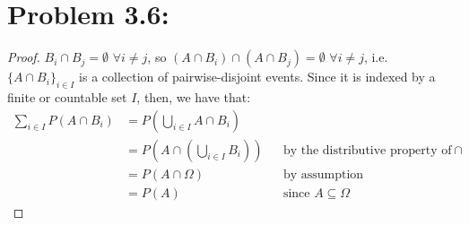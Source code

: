 \documentclass{article}
\begin{document}
\section{Problem 3.6:}

\begin{proof}
$B_i \cap B_j = \emptyset$ $\forall i \ne j$, so $(A \cap B_i) \cap (A \cap B_j) = \emptyset$ $\forall i \ne j$, i.e. $\{A \cap B_i\}_{i \in I}$ is a collection of pairwise-disjoint events. Since it is indexed by a finite or countable set $I$, then, we have that:
\begin{align*}
\sum\limits_{i \in I} P(A \cap B_i) &= P(\bigcup\limits_{i \in I} A \cap B_i) \\
&= P(A \cap (\bigcup\limits_{i \in I} B_i)) &&\text{by the distributive property of $\cap$} \\
&= P(A \cap \Omega) &&\text{by assumption} \\
&= P(A) &&\text{since $A \subseteq \Omega$}
\end{align*}
\end{proof}
\end{document}
